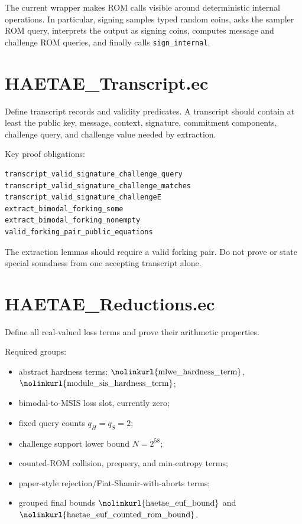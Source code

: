 \documentclass[11pt]{report}
\DeclareRobustCommand{\ec}[1]{\ifmmode\text{\nolinkurl{#1}}\else\nolinkurl{#1}\fi}
\theoremstyle{definition}
\theoremstyle{plain}
\begin{document}
The current wrapper makes ROM calls visible around deterministic internal
operations.  In particular, signing samples typed random coins, asks the sampler
ROM query, interprets the output as signing coins, computes message and
challenge ROM queries, and finally calls \ec{sign\_internal}.

\section{HAETAE\_Transcript.ec}

Define transcript records and validity predicates.  A transcript should contain
at least the public key, message, context, signature, commitment components,
challenge query, and challenge value needed by extraction.

Key proof obligations:

\begin{lstlisting}[language=EasyCrypt]
transcript_valid_signature_challenge_query
transcript_valid_signature_challenge_matches
transcript_valid_signature_challengeE
extract_bimodal_forking_some
extract_bimodal_forking_nonempty
valid_forking_pair_public_equations
\end{lstlisting}

The extraction lemmas should require a valid forking pair.  Do not prove or
state special soundness from one accepting transcript alone.

\section{HAETAE\_Reductions.ec}

Define all real-valued loss terms and prove their arithmetic properties.

Required groups:

\begin{itemize}
\item abstract hardness terms:
\(\ec{mlwe\_hardness\_term}\),
\(\ec{module\_sis\_hardness\_term}\);
\item bimodal-to-MSIS loss slot, currently zero;
\item fixed query counts \(q_H=q_S=2\);
\item challenge support lower bound \(N=2^{58}\);
\item counted-ROM collision, prequery, and min-entropy terms;
\item paper-style rejection/Fiat-Shamir-with-aborts terms;
\item grouped final bounds
\(\ec{haetae\_euf\_bound}\) and
\(\ec{haetae\_euf\_counted\_rom\_bound}\).
\end{itemize}
\end{document}

